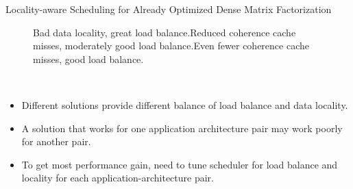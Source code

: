\begin{frame}[label=ladmf]{Locality-aware Scheduling for Already Optimized Dense Matrix Factorization}
\begin{figure}
{\tiny Bad data locality, great load balance.}{\tiny Reduced coherence cache misses, moderately good load balance.}{\tiny Even fewer coherence cache misses, good load balance.}\end{figure}\hspace*{0.3in}\
\vspace*{-0.2in}
\begin{itemize} 
\tiny \item \tiny Different solutions provide different balance of load balance and data locality. 
\tiny \item \tiny A solution that works for one application architecture pair may work poorly for another pair.
\item \tiny To get most performance gain, need to tune scheduler for load balance and locality for each application-architecture pair.
\end{itemize} 
\end{frame}

